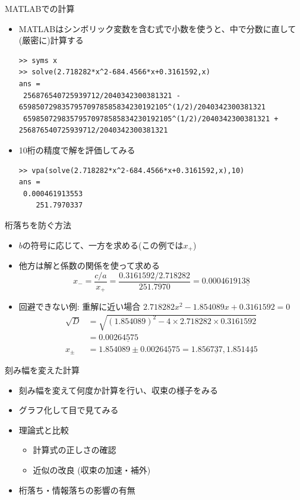 \begin{frame}[t,fragile]{MATLABでの計算}
  \begin{itemize}
    \setlength{\itemsep}{1em}
  \item MATLABはシンボリック変数を含む式で小数を使うと、中で分数に直して(厳密に)計算する
    \begin{lstlisting}
>> syms x
>> solve(2.718282*x^2-684.4566*x+0.3161592,x)
ans =
 256876540725939712/2040342300381321 - 65985072983579570978585834230192105^(1/2)/2040342300381321
 65985072983579570978585834230192105^(1/2)/2040342300381321 + 256876540725939712/2040342300381321
    \end{lstlisting}
    \item 10桁の精度で解を評価してみる
    \begin{lstlisting}
>> vpa(solve(2.718282*x^2-684.4566*x+0.3161592,x),10)
ans =
 0.000461913553
    251.7970337
    \end{lstlisting}
  \end{itemize}
\end{frame}

\begin{frame}[t,fragile]{桁落ちを防ぐ方法}
  \begin{itemize}
    \setlength{\itemsep}{1em}
  \item $b$の符号に応じて、一方を求める(この例では$x_+$)
  \item 他方は解と係数の関係を使って求める
    \[
    x_- = \frac{c/a}{x_+} = \frac{0.3161592 / 2.718282}{251.7970} = 0.000461913\underline{8}
    \]
  \item 回避できない例: 重解に近い場合 $2.718282x^2 - 1.854089x + 0.3161592=0$
    \begin{align*}
      \sqrt{D} &= \sqrt{(1.854089)^2 - 4 \times 2.718282 \times 0.3161592} \\ &= 0.002\underline{64575} \\
      x_\pm &= 1.854089 \pm 0.002\underline{64575} = 1.856\underline{737}, 1.851\underline{445}
    \end{align*}
  \end{itemize}
\end{frame}

\begin{frame}[t,fragile]{刻み幅を変えた計算}
  \begin{itemize}
    \setlength{\itemsep}{1em}
  \item 刻み幅を変えて何度か計算を行い、収束の様子をみる
  \item グラフ化して目で見てみる
  \item 理論式と比較
    \begin{itemize}
    \item 計算式の正しさの確認
    \item 近似の改良 (収束の加速・補外)
    \end{itemize}
  \item 桁落ち・情報落ちの影響の有無
  \end{itemize}
\end{frame}
